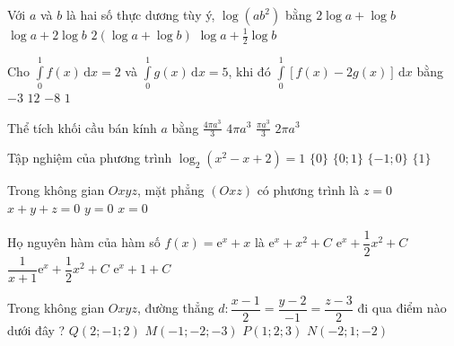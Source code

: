 \documentclass[10pt,a4paper,twoside]{book}
\begin{document}
\begin{ex}%
Với $a$ và $b$ là hai số thực dương tùy ý, $\log\left(ab^2\right)$ bằng
\choice
{$2\log a+\log b$}
{\True $\log a+2\log b$}
{$2\left(\log a+\log b\right)$}
{$\log a+\frac12\log b$}
\end{ex}

\begin{ex}%
Cho $\displaystyle\int\limits_0^1 f(x)\mathrm{\,d}x=2$ và $\displaystyle\int\limits_0^1 g(x)\mathrm{\,d}x=5$, khi đó $\displaystyle\int\limits_0^1 \left[f(x)-2g(x)\right]\mathrm{\,d}x$ bằng
\choice
{$-3$}
{$12$}
{\True $-8$}
{$1$}
\end{ex}

\begin{ex}%
Thể tích khối cầu bán kính $a$ bằng
\choice
{\True $\frac{4\pi a^3}3$}
{$4\pi a^3$}
{$\frac{\pi a^3}3$}
{$2\pi a^3$}
\end{ex}

\begin{ex}%
Tập nghiệm của phương trình $\log_2\left(x^2-x+2\right)=1$
\choice
{$\{0\}$}
{\True $\{0;1\}$}
{$\{-1;0\}$}
{$\{1\}$}
\end{ex}

\begin{ex}%
Trong không gian $Oxyz$, mặt phẳng $(Oxz)$ có phương trình là
\choice
{$z=0$}
{$x+y+z=0$}
{\True $y=0$}
{$x=0$}
\end{ex}

\begin{ex}%
Họ nguyên hàm của hàm số $f(x)=\mathrm{e}^x+x$ là
\choice
{$\mathrm{e}^x+x^2+C$}
{\True $\mathrm{e}^x+\dfrac12x^2+C$}
{$\dfrac1{x+1}\mathrm{e}^x+\dfrac12x^2+C$}
{$\mathrm{e}^x+1+C$}
\end{ex}

\begin{ex}%
Trong không gian $Oxyz$, đường thẳng $d:\dfrac{x-1}2=\dfrac{y-2}{-1}=\dfrac{z-3}2$ đi qua điểm nào dưới đây ?
\choice
{$Q(2;-1;2)$}
{$M(-1;-2;-3)$}
{\True $P(1;2;3)$}
{$N(-2;1;-2)$}
\end{ex}
\end{document}
